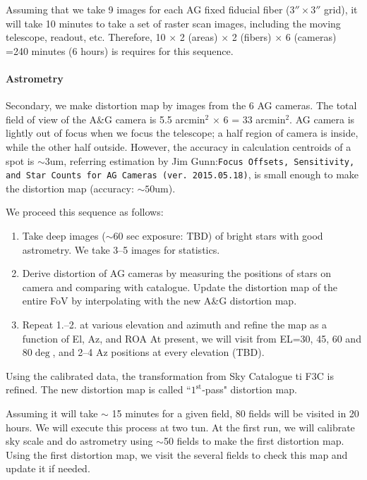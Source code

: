 Assuming that we take 9 images for each AG fixed fiducial fiber ($3'' \times 3''$ grid), it will take 10 minutes to take a set of raster scan images, including the moving telescope, readout, etc.
Therefore, 10 $\times$ 2 (areas) $\times$ 2 (fibers) $\times$ 6 (cameras) =240 minutes (6 hours) is requires for this sequence.


\paragraph{Astrometry}
Secondary, we make distortion map by images from the 6 AG cameras.
The total field of view of the A\&G camera is 5.5 arcmin$^2$ $\times$ 6 = 33 arcmin$^2$.
AG camera is lightly out of focus when we focus the telescope; a half region of camera is inside, while the other half outside.
However, the accuracy in calculation centroids of a spot is $\sim$3um, referring estimation by Jim Gunn:{\tt Focus Offsets, Sensitivity, and Star Counts for AG Cameras (ver. 2015.05.18)}, is small enough to make the distortion map (accuracy: $\sim 50$um).

We proceed this sequence as follows:
\begin{enumerate}
\item Take deep images ($\sim 60$ sec exposure: TBD) of bright stars with good astrometry.
We take 3--5 images for statistics.
\item Derive distortion of AG cameras by measuring the positions of stars on camera and comparing with catalogue.
Update the distortion map of the entire FoV by interpolating with the new A\&G distortion map.
\item Repeat 1.--2. at various elevation and azimuth and refine the map as a function of El, Az, and ROA
At present, we will visit from EL=30, 45, 60 and 80$\deg$, and 2--4 Az positions at every elevation (TBD).
\end{enumerate}
Using the calibrated data, the transformation from Sky Catalogue ti F3C is refined.
The new distortion map is called ``$1^\mathrm{st}$-pass" distortion map.

Assuming it will take $\sim$ 15 minutes for a given field, 80 fields will be visited in 20 hours.
We will execute this process at two tun.
At the first run, we will calibrate sky scale and do astrometry using $\sim$50 fields to make the first distortion map.
Using the first distortion map, we visit the several fields to check this map and update it if needed.

